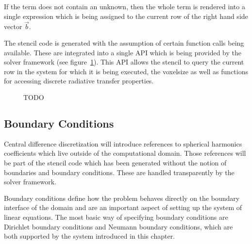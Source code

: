 If the term does not contain an unknown, then the whole term is rendered into a single expression which is being assigned to the current row of the right hand side vector $\vec{b}$.

The stencil code is generated with the assumption of certain function calls being available. These are integrated into a single API which is being provided by the solver framework (see figure~\ref{fig:pn_discretization_codegen_stencilAPI}). This API allows the stencil to query the current row in the system for which it is being executed, the voxelsize as well as functions for accessing discrete radiative transfer properties.
\begin{figure}[h]
\centering
{}
\caption{TODO}
\label{fig:pn_discretization_codegen_stencilAPI}
\end{figure}


\subsection{Boundary Conditions}
\label{sec:pn_bc}

Central difference discretization will introduce references to spherical harmonics coefficients which live outside of the computational domain. Those references will be part of the stencil code which has been generated without the notion of boundaries and boundary conditions. These are handled transparently by the solver framework.

Boundary conditions define how the problem behaves directly on the boundary interface of the domain and are an important aspect of setting up the system of linear equations. The most basic way of specifying boundary conditions are Dirichlet boundary conditions and Neumann boundary conditions, which are both supported by the system introduced in this chapter.

